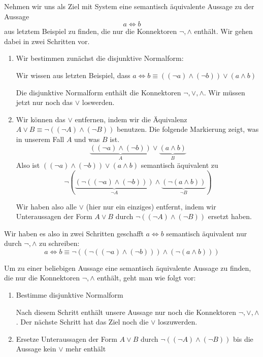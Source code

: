 \documentclass[../../main.tex]{subfiles}
\begin{document}
    \begin{example}{}
        Nehmen wir uns als Ziel mit System eine semantisch 
        äquivalente Aussage zu der Aussage
        \[a \iff b\]
        aus letztem Beispiel zu finden, die nur die Konnektoren $\lnot,\land$
        enthält.
        Wir gehen dabei in zwei Schritten vor.
        \begin{enumerate}
            \item Wir bestimmen zunächst die disjunktive Normalform:
            
                Wir wissen aus letzten Beispiel, dass $a \iff b \equiv ( (\lnot a) \land (\lnot b)) \lor (a \land b)$

                Die disjunktive Normalform enthält die Konnektoren $\lnot,\lor,\land$. Wir 
                müssen jetzt nur noch das $\lor$ loswerden.
            
            \item Wir können das $\lor$ entfernen, indem wir die Äquivalenz 
             $A \lor B \equiv \lnot ((\lnot A) \land (\lnot B))$ benutzen.
             Die folgende Markierung zeigt, was in unserem Fall 
             $A$ und was $B$ ist.
             \[\underbrace{((\lnot a) \land (\lnot b))}_{A} 
             \lor \underbrace{(a \land b)}_{B} \]
            Also ist $( (\lnot a) \land (\lnot b)) \lor (a \land b)$ semantisch 
            äquivalent zu 
            \[\lnot (   \underbrace{(\lnot ( (\lnot a) \land (\lnot b)))}_{\lnot A} 
                \land \underbrace{(\lnot (a \land b))}_{\lnot B}
            )\] 
            
            Wir haben also alle $\lor$ (hier nur ein einziges) entfernt, indem wir 
            Unteraussagen der Form $A \lor B$ durch $\lnot((\lnot A) \land (\lnot B))$
            ersetzt haben.

        \end{enumerate}

    Wir haben es also in zwei Schritten geschafft $a \iff b$ semantisch äquivalent 
    nur durch $\lnot,\land$ zu schreiben:
    \[ a \iff b \equiv \lnot ((\lnot ( (\lnot a) \land (\lnot b))) \land (\lnot (a \land b)))\]
    \end{example}

    Um zu einer beliebigen Aussage eine semantisch äquivalente Aussage 
    zu finden, die nur die Konnektoren $\lnot,\land$ enthält, geht man wie 
    folgt vor:

    \begin{enumerate}
        \item Bestimme disjunktive Normalform
        
            Nach diesem Schritt enthält unsere Aussage nur noch die Konnektoren 
            $\lnot,\lor,\land$. Der nächste Schritt hat das Ziel noch die $\lor$ loszuwerden.
        \item Ersetze Unteraussagen der Form $A \lor B$ durch 
                $\lnot ((\lnot A) \land (\lnot B))$ bis die Aussage kein $\lor$ mehr enthält
    \end{enumerate}
    
\end{document}
